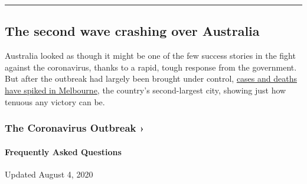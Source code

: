 \begin{center}\rule{0.5\linewidth}{\linethickness}\end{center}

\hypertarget{the-second-wave-crashing-over-australia}{%
\subsection{The second wave crashing over
Australia}\label{the-second-wave-crashing-over-australia}}

Australia looked as though it might be one of the few success stories in
the fight against the coronavirus, thanks to a rapid, tough response
from the government. But after the outbreak had largely been brought
under control,
\href{https://www.nytimes3xbfgragh.onion/2020/08/04/world/australia/coronavirus-melbourne-lockdown.html}{cases
and deaths have spiked in Melbourne}, the country's second-largest city,
showing just how tenuous any victory can be.

\href{https://www.nytimes3xbfgragh.onion/news-event/coronavirus?action=click\&pgtype=Article\&state=default\&region=MAIN_CONTENT_3\&context=storylines_faq}{}

\hypertarget{the-coronavirus-outbreak-}{%
\subsubsection{The Coronavirus Outbreak
›}\label{the-coronavirus-outbreak-}}

\hypertarget{frequently-asked-questions}{%
\paragraph{Frequently Asked
Questions}\label{frequently-asked-questions}}

Updated August 4, 2020

